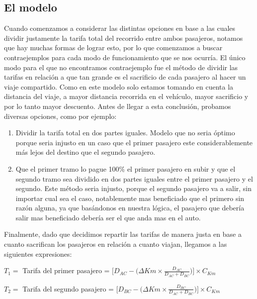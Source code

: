 \documentclass[12pt]{report}
\begin{document}
\subsection*{El modelo}
Cuando comenzamos a considerar las distintas opciones en base a las cuales dividir justamente la tarifa total del recorrido entre ambos pasajeros, notamos que hay muchas formas de lograr esto, por lo que comenzamos a buscar contraejemplos para cada modo de funcionamiento que se nos ocurría. El único modo para el que no encontramos contraejemplo fue el método de dividir las tarifas en relación a que tan grande es el sacrificio de cada pasajero al hacer un viaje compartido. Como en este modelo solo estamos tomando en cuenta la distancia del viaje, a mayor distancia recorrida en el vehículo, mayor sacrificio y por lo tanto mayor descuento. Antes de llegar a esta conclusión, probamos diversas opciones, como por ejemplo: 
\newline

\begin{enumerate}
    \item Dividir la tarifa total en dos partes iguales. Modelo que no seria óptimo porque seria injusto en un caso que el primer pasajero este considerablemente más lejos del destino que el segundo pasajero.
    \item Que el primer tramo lo pague 100\% el primer pasajero en subir y que el segundo tramo sea dividido en dos partes iguales entre el primer pasajero y el segundo. Este método seria injusto, porque el segundo pasajero va a salir, sin importar cual sea el caso, notablemente mas beneficiado que el primero sin razón alguna, ya que basándonos en nuestra lógica, el pasajero que debería salir mas beneficiado debería ser el que anda mas en el auto.
\end{enumerate}

Finalmente, dado que decidimos repartir las tarifas de manera justa en base a cuanto sacrifican los pasajeros en relación a cuanto viajan, llegamos a las siguientes expresiones:

\begin{center}
    \item $T_{1}=$ Tarifa del primer pasajero = $\Big[ D_{AC}-\Big(\Delta Km \times \frac{D_{AC}}{D_{AC}+D_{BC}}\Big) \Big]\times C_{Km}$
    \item $T_{2}=$ Tarifa del segundo pasajero = $\Big[ D_{BC}-\Big(\Delta Km \times \frac{D_{BC}}{D_{AC}+D_{BC}}\Big) \Big]\times C_{Km}$
\end{center} 
\end{document}
